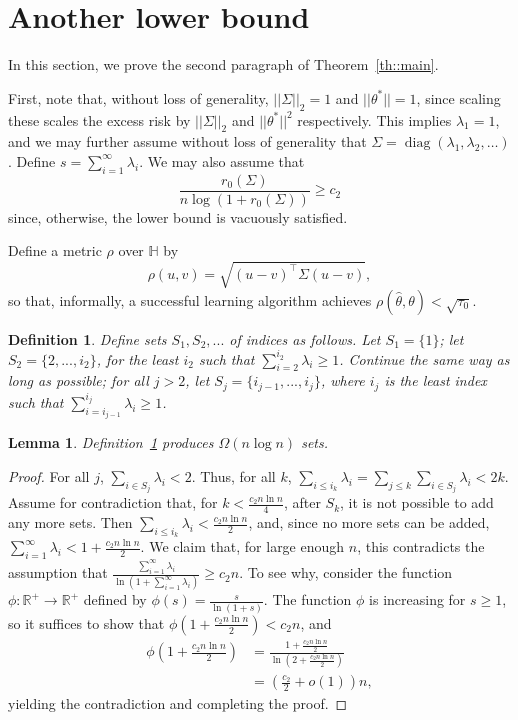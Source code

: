 \documentclass[11pt,notitlepage]{article}
\newcommand\bbH{\mathbb{H}}
\newcommand{\htheta}{\hat{\theta}}
\newcommand\R {\mathbb{R}}
\newcommand\diag {\ensuremath{\operatorname{\mathrm{diag}}}}
\newtheorem{definition}[theorem]{Definition}
\newtheorem{lemma}[theorem]{Lemma}
\begin{document}
\section{Another lower bound}\label{a:packing}

In this section, we prove 
the second paragraph of Theorem~\ref{th::main}.

First, note that, without loss of generality,
$|| \Sigma ||_2 = 1$ and $|| \theta^* || = 1$,
since scaling these scales the excess risk by 
$|| \Sigma ||_2$ and $|| \theta^* ||^2$ respectively.
This implies $\lambda_1 = 1$, and we may further
assume without loss of generality that
$\Sigma = \diag(\lambda_1, \lambda_2,\ldots)$.  Define
$s = \sum_{i=1}^{\infty} \lambda_i$.  
We may also assume that
\begin{equation}
\label{e:r0.big}
\frac{r_0(\Sigma)}{n
        \log\left(1+r_0(\Sigma)\right)}\ge c_2
\end{equation}
since, otherwise, the lower bound is vacuously satisfied.

Define a metric $\rho$ over $\bbH$ by
\[
\rho(u,v) = \sqrt{ (u - v)^{\top} \Sigma (u - v) },
\]
so that, informally, a successful learning algorithm
achieves $\rho(\htheta,\theta) < \sqrt{\tau_0}$.

\begin{definition}
\label{d:S}
Define sets $S_1, S_2,...$ of indices as follows.  
Let $S_1 = \{ 1 \}$;  let $S_2 = \{ 2,..., i_2 \}$, for
the least $i_2$ such that $\sum_{i=2}^{i_2} \lambda_i \geq 1$.
Continue the same way as long as possible; for all $j > 2$, let
$S_j = \{ i_{j-1},...,i_j \}$, where $i_j$ is the least index
such that $\sum_{i=i_{j-1}}^{i_j} \lambda_i \geq 1$.
\end{definition}

\begin{lemma}
Definition~\ref{d:S} produces $\Omega(n \log n)$ sets.
\end{lemma}
\begin{proof}
For all $j$, $\sum_{i \in S_j} \lambda_i < 2$.  
Thus, for all $k$, 
$\sum_{i \leq i_k} \lambda_i = \sum_{j \leq k} \sum_{i \in S_j} \lambda_i < 2 k$.  
Assume for contradiction that, for $k < \frac{c_2 n \ln n}{4}$, 
after $S_k$,
it is not possible to add any more sets.  Then
$\sum_{i \leq i_k} \lambda_i < \frac{c_2 n \ln n}{2}$,
and, since no more sets can be added,
$\sum_{i = 1}^{\infty} \lambda_i < 1 + \frac{c_2 n \ln n}{2}$.
We claim that, for large enough $n$, this contradicts the assumption that
$\frac{\sum_{i = 1}^{\infty} \lambda_i}
      {\ln \left(1 + \sum_{i = 1}^{\infty} \lambda_i \right)} \geq c_2 n$.
To see why, consider the function $\phi : \R^+ \rightarrow \R^+$ defined
by $\phi(s) = \frac{s}{\ln (1 + s)}$.  The function $\phi$ is
increasing for $s \geq 1$, so it suffices to show that
$\phi\left( 1 + \frac{c_2 n \ln n}{2} \right) < c_2 n$,
and 
\begin{align*}
\phi\left( 1 + \frac{c_2 n \ln n}{2} \right) 
  &  = \frac{1 + \frac{c_2 n \ln n}{2}}{\ln \left(2 + \frac{c_2 n \ln n}{2} \right)} \\
  &  = \left( \frac{c_2}{2} + o(1) \right) n,
\end{align*}
yielding the contradiction and completing the proof.
\end{proof}
\end{document}
